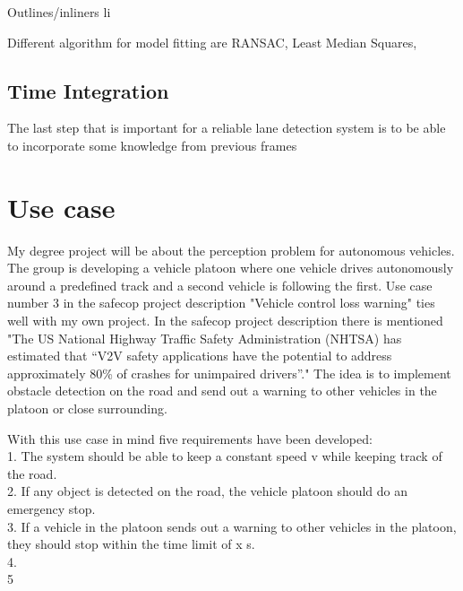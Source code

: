 Outlines/inliners li

Different algorithm for model fitting are RANSAC, Least Median Squares, 

\subsection{Time Integration}
The last step that is important for a reliable lane detection system is to be able to incorporate some knowledge from previous frames 


\section{Use case}
My degree project will be about the perception problem for autonomous vehicles. The group is developing a vehicle platoon where one vehicle drives autonomously around a predefined track and a second vehicle is following the first. Use case number 3 in the safecop project description "Vehicle control loss warning" ties well with my own project. In the safecop project description there is mentioned "The US National Highway Traffic Safety Administration (NHTSA) has estimated that “V2V safety
applications have the potential to address approximately 80\% of crashes for unimpaired drivers”." The idea is to implement obstacle detection on the road and send out a warning to other vehicles in the platoon or close surrounding.

With this use case in mind five requirements have been developed:\\

1. The system should be able to keep a constant speed v while keeping track of the road.\\
2. If any object is detected on the road, the vehicle platoon should do an emergency stop.\\
3. If a vehicle in the platoon sends out a warning to other vehicles in the platoon, they should stop within the time limit of x s. \\
4. \\
5\\